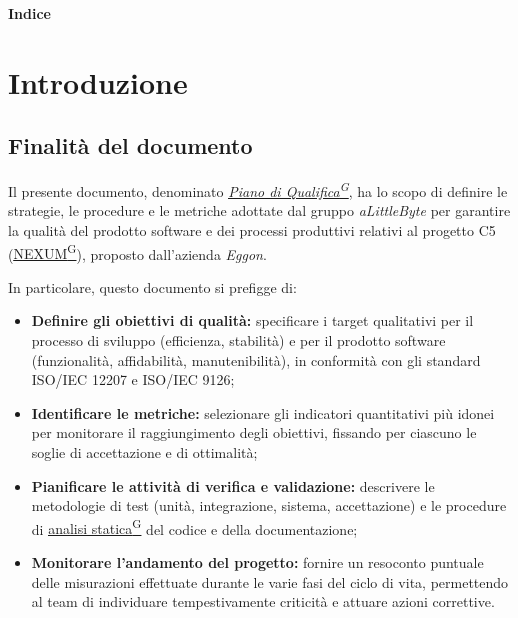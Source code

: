 \documentclass[a4paper,12pt]{article}
\providecommand{\glslink}[2]{\href{https://alittlebyte-19.github.io/Documentazione/glossario.html\#gls-#1}{\underline{#2}\textsuperscript{\scriptsize G}}}
\begin{document}
\begin{center} 
    {\Large \textbf{Indice}}
\end{center}

\vspace{0.6cm}

\makeatletter
{}
\makeatother

\newpage
{}
\hypersetup{pageanchor=true}
\setcounter{page}{4}

\section{Introduzione}

\subsection{Finalità del documento}
Il presente documento, denominato \textit{\glslink{piano-di-qualifica}{Piano di Qualifica}}, ha lo scopo di definire le strategie, le procedure e le metriche adottate dal gruppo \textit{aLittleByte} per garantire la qualità del prodotto software e dei processi produttivi relativi al progetto C5 (\glslink{nexum}{NEXUM}), proposto dall'azienda \textit{Eggon}.

In particolare, questo documento si prefigge di:
\begin{itemize}
    \item \textbf{Definire gli obiettivi di qualità:} specificare i target qualitativi per il processo di sviluppo (efficienza, stabilità) e per il prodotto software (funzionalità, affidabilità, manutenibilità), in conformità con gli standard ISO/IEC 12207 e ISO/IEC 9126;
    \item \textbf{Identificare le metriche:} selezionare gli indicatori quantitativi più idonei per monitorare il raggiungimento degli obiettivi, fissando per ciascuno le soglie di accettazione e di ottimalità;
    \item \textbf{Pianificare le attività di verifica e validazione:} descrivere le metodologie di test (unità, integrazione, sistema, accettazione) e le procedure di \glslink{analisi-statica}{analisi statica} del codice e della documentazione;
    \item \textbf{Monitorare l'andamento del progetto:} fornire un resoconto puntuale delle misurazioni effettuate durante le varie fasi del ciclo di vita, permettendo al team di individuare tempestivamente criticità e attuare azioni correttive.
\end{itemize}
\end{document}
